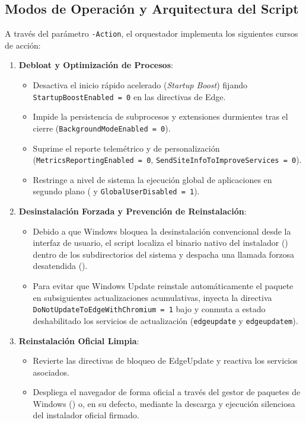 \documentclass[12pt,a4paper]{report}
\begin{document}
\subsection{Modos de Operación y Arquitectura del Script}
A través del parámetro \texttt{-Action}, el orquestador implementa los siguientes cursos de acción:
\begin{enumerate}
    \item \textbf{Debloat y Optimización de Procesos}:
    \begin{itemize}
        \item Desactiva el inicio rápido acelerado (\textit{Startup Boost}) fijando \texttt{StartupBoostEnabled = 0} en las directivas de Edge.
        \item Impide la persistencia de subprocesos y extensiones durmientes tras el cierre (\texttt{BackgroundModeEnabled = 0}).
        \item Suprime el reporte telemétrico y de personalización (\texttt{MetricsReportingEnabled = 0}, \texttt{SendSiteInfoToImproveServices = 0}).
        \item Restringe a nivel de sistema la ejecución global de aplicaciones en segundo plano ( y \texttt{GlobalUserDisabled = 1}).
    \end{itemize}
    \item \textbf{Desinstalación Forzada y Prevención de Reinstalación}:
    \begin{itemize}
        \item Debido a que Windows bloquea la desinstalación convencional desde la interfaz de usuario, el script localiza el binario nativo del instalador () dentro de los subdirectorios del sistema y despacha una llamada forzosa desatendida ().
        \item Para evitar que Windows Update reinstale automáticamente el paquete en subsiguientes actualizaciones acumulativas, inyecta la directiva \texttt{DoNotUpdateToEdgeWithChromium = 1} bajo  y conmuta a estado deshabilitado los servicios de actualización (\texttt{edgeupdate} y \texttt{edgeupdatem}).
    \end{itemize}
    \item \textbf{Reinstalación Oficial Limpia}:
    \begin{itemize}
        \item Revierte las directivas de bloqueo de EdgeUpdate y reactiva los servicios asociados.
        \item Despliega el navegador de forma oficial a través del gestor de paquetes de Windows () o, en su defecto, mediante la descarga y ejecución silenciosa del instalador oficial firmado.
    \end{itemize}
\end{enumerate}
\end{document}

